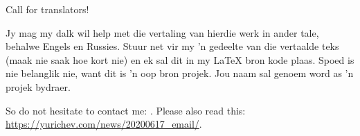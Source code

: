 \vspace*{\fill}

\Huge Call for translators!

\normalsize

\bigskip
\bigskip
\bigskip

Jy mag my dalk wil help met die vertaling van hierdie werk in ander
tale, behalwe Engels en Russies. Stuur net vir my 'n gedeelte van die
vertaalde teks (maak nie saak hoe kort nie) en ek sal dit in my LaTeX
bron kode plaas. Spoed is nie belanglik nie, want dit is 'n oop bron
projek. Jou naam sal genoem word as 'n projek bydraer.

So do not hesitate to contact me: \GTT{\EMAILS}.
Please also read this: \url{https://yurichev.com/news/20200617_email/}.

\vspace*{\fill}
\vfill
